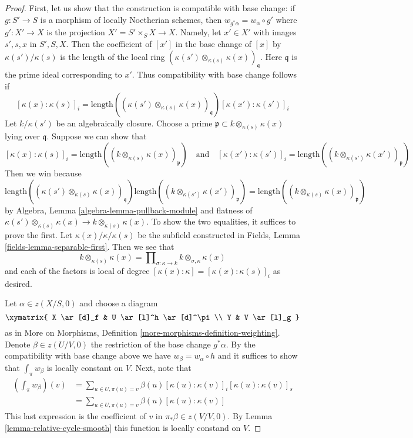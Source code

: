 \begin{proof}
First, let us show that the construction is compatible with base
change: if $g : S' \to S$ is a morphism of locally Noetherian schemes,
then $w_{g^*\alpha} = w_\alpha \circ g'$ where $g' : X' \to X$ is the
projection $X' = S' \times_S X \to X$. Namely, let $x' \in X'$ with
images $s', s, x$ in $S', S, X$. Then the coefficient of $[x']$ in
the base change of $[x]$ by $\kappa(s')/\kappa(s)$ is the length of
the local ring $(\kappa(s') \otimes_{\kappa(s)} \kappa(x))_\mathfrak q$.
Here $\mathfrak q$ is the prime ideal corresponding to $x'$.
Thus compatibility with base change follows if
$$
[\kappa(x) : \kappa(s)]_i =
\text{length}((\kappa(s') \otimes_{\kappa(s)} \kappa(x))_\mathfrak q)
[\kappa(x') : \kappa(s')]_i
$$
Let $k/\kappa(s')$ be an algebraically closure. Choose a prime
$\mathfrak p \subset k \otimes_{\kappa(s)} \kappa(x)$ lying
over $\mathfrak q$. Suppose we can show that
$$
[\kappa(x) : \kappa(s)]_i =
\text{length}((k \otimes_{\kappa(s)} \kappa(x))_\mathfrak p)
\quad\text{and}\quad
[\kappa(x') : \kappa(s')]_i =
\text{length}((k \otimes_{\kappa(s')} \kappa(x'))_\mathfrak p)
$$
Then we win because
$$
\text{length}((\kappa(s') \otimes_{\kappa(s)} \kappa(x))_\mathfrak q)
\text{length}((k \otimes_{\kappa(s')} \kappa(x'))_\mathfrak p)
=
\text{length}((k \otimes_{\kappa(s)} \kappa(x))_\mathfrak p)
$$
by Algebra, Lemma \ref{algebra-lemma-pullback-module} and flatness of
$\kappa(s') \otimes_{\kappa(s)} \kappa(x) \to k \otimes_{\kappa(s)} \kappa(x)$.
To show the two equalities, it suffices to prove the first.
Let $\kappa(x)/\kappa/\kappa(s)$ be the subfield constructed in
Fields, Lemma \ref{fields-lemma-separable-first}. Then we see that
$$
k \otimes_{\kappa(s)} \kappa(x) =
\prod\nolimits_{\sigma : \kappa \to k}
k \otimes_{\sigma, \kappa} \kappa(x)
$$
and each of the factors is local of degree
$[\kappa(x) : \kappa] = [\kappa(x) : \kappa(s)]_i$
as desired.

\medskip\noindent
Let $\alpha \in z(X/S, 0)$ and choose a diagram
$$
\xymatrix{
X \ar[d]_f & U \ar[l]^h \ar[d]^\pi \\
Y & V \ar[l]_g
}
$$
as in More on Morphisms, Definition \ref{more-morphisms-definition-weighting}.
Denote $\beta \in z(U/V, 0)$ the restriction of the base change $g^*\alpha$.
By the compatibility with base change above we have
$w_\beta = w_\alpha \circ h$ and it suffices to show that
$\int_\pi w_\beta$ is locally constant on $V$. Next, note that
\begin{align*}
\left( \int_\pi w_\beta \right)(v)
& =
\sum\nolimits_{u \in U, \pi(u) = v} 
\beta(u) [\kappa(u) : \kappa(v)]_i [\kappa(u) : \kappa(v)]_s \\
& =
\sum\nolimits_{u \in U, \pi(u) = v} \beta(u)[\kappa(u) : \kappa(v)]
\end{align*}
This last expression is the coefficient of $v$ in $\pi_*\beta \in z(V/V, 0)$.
By Lemma \ref{lemma-relative-cycle-smooth} this function is locally
constand on $V$.


\end{proof}
